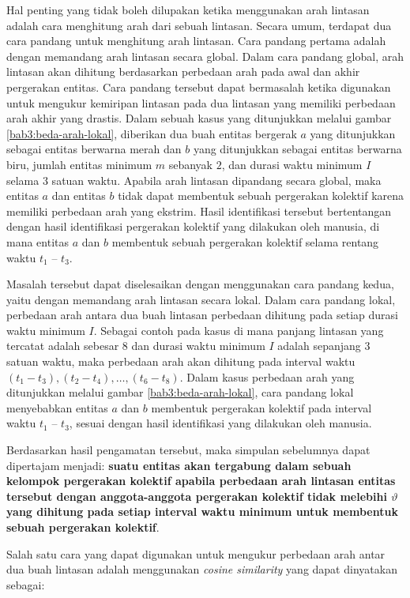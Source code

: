 \documentclass[a4paper,twoside]{article}
\begin{document}
Hal penting yang tidak boleh dilupakan ketika menggunakan arah lintasan adalah cara menghitung arah dari sebuah lintasan. Secara umum, terdapat dua cara pandang untuk menghitung arah lintasan. Cara pandang pertama adalah dengan memandang arah lintasan secara global. Dalam cara pandang global, arah lintasan akan dihitung berdasarkan perbedaan arah pada awal dan akhir pergerakan entitas. Cara pandang tersebut dapat bermasalah ketika digunakan untuk mengukur kemiripan lintasan pada dua lintasan yang memiliki perbedaan arah akhir yang drastis. Dalam sebuah kasus yang ditunjukkan melalui gambar \ref{bab3:beda-arah-lokal}, diberikan dua buah entitas bergerak $a$ yang ditunjukkan sebagai entitas berwarna merah dan $b$ yang ditunjukkan sebagai entitas berwarna biru, jumlah entitas minimum $m$ sebanyak $2$, dan durasi waktu minimum $I$ selama $3$ satuan waktu. Apabila arah lintasan dipandang secara global, maka entitas $a$ dan entitas $b$ tidak dapat membentuk sebuah pergerakan kolektif karena memiliki perbedaan arah yang ekstrim. Hasil identifikasi tersebut bertentangan dengan hasil identifikasi pergerakan kolektif yang dilakukan oleh manusia, di mana entitas $a$ dan $b$ membentuk sebuah pergerakan kolektif selama rentang waktu $t_1$ -- $t_3$.

Masalah tersebut dapat diselesaikan dengan menggunakan cara pandang kedua, yaitu dengan memandang arah lintasan secara lokal. Dalam cara pandang lokal, perbedaan arah antara dua buah lintasan perbedaan dihitung pada setiap durasi waktu minimum $I$. Sebagai contoh pada kasus di mana panjang lintasan yang tercatat adalah sebesar $8$ dan durasi waktu minimum $I$ adalah sepanjang $3$ satuan waktu, maka perbedaan arah akan dihitung pada interval waktu $(t_1 - t_3), (t_2 - t_4), \ldots, (t_6 - t_8)$. Dalam kasus perbedaan arah yang ditunjukkan melalui gambar \ref{bab3:beda-arah-lokal}, cara pandang lokal menyebabkan entitas $a$ dan $b$ membentuk pergerakan kolektif pada interval waktu $t_1$ -- $t_3$, sesuai dengan hasil identifikasi yang dilakukan oleh manusia.

Berdasarkan hasil pengamatan tersebut, maka simpulan sebelumnya dapat dipertajam menjadi: \textbf{suatu entitas akan tergabung dalam sebuah kelompok pergerakan kolektif apabila perbedaan arah lintasan entitas tersebut dengan anggota-anggota pergerakan kolektif tidak melebihi $\vartheta$ yang dihitung pada setiap interval waktu minimum untuk membentuk sebuah pergerakan kolektif}.

Salah satu cara yang dapat digunakan untuk mengukur perbedaan arah antar dua buah lintasan adalah menggunakan \textit{cosine similarity} yang dapat dinyatakan sebagai:
\end{document}
